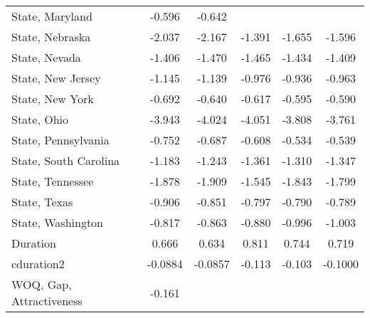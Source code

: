 {\begin{center}
{\begin{longtable}{l*{5}{c}}
\addlinespace
State, Maryland          &      -0.596         &      -0.642         &                     &                     &                     \\
\addlinespace
State, Nebraska          &      -2.037\sym{*}  &      -2.167\sym{*}  &      -1.391         &      -1.655         &      -1.596         \\
\addlinespace
State, Nevada            &      -1.406         &      -1.470         &      -1.465         &      -1.434         &      -1.409         \\
\addlinespace
State, New Jersey        &      -1.145         &      -1.139         &      -0.976         &      -0.936         &      -0.963         \\
\addlinespace
State, New York          &      -0.692\sym{**} &      -0.640\sym{*}  &      -0.617\sym{*}  &      -0.595\sym{*}  &      -0.590\sym{*}  \\
\addlinespace
State, Ohio              &      -3.943\sym{***}&      -4.024\sym{***}&      -4.051\sym{***}&      -3.808\sym{***}&      -3.761\sym{***}\\
\addlinespace
State, Pennsylvania      &      -0.752         &      -0.687         &      -0.608         &      -0.534         &      -0.539         \\
\addlinespace
State, South Carolina    &      -1.183         &      -1.243         &      -1.361         &      -1.310         &      -1.347         \\
\addlinespace
State, Tennessee         &      -1.878\sym{**} &      -1.909\sym{**} &      -1.545\sym{*}  &      -1.843\sym{**} &      -1.799\sym{**} \\
\addlinespace
State, Texas             &      -0.906\sym{**} &      -0.851\sym{**} &      -0.797\sym{**} &      -0.790\sym{**} &      -0.789\sym{**} \\
\addlinespace
State, Washington        &      -0.817         &      -0.863\sym{*}  &      -0.880\sym{*}  &      -0.996\sym{**} &      -1.003\sym{**} \\
\addlinespace
Duration                 &       0.666\sym{**} &       0.634\sym{**} &       0.811\sym{***}&       0.744\sym{**} &       0.719\sym{**} \\
\addlinespace
cduration2               &     -0.0884\sym{**} &     -0.0857\sym{**} &      -0.113\sym{***}&      -0.103\sym{**} &     -0.1000\sym{**} \\
\addlinespace
WOQ, Gap, Attractiveness &      -0.161\sym{***}&                     &                     &                     &                     \\

\end{longtable}}
\end{center}}
